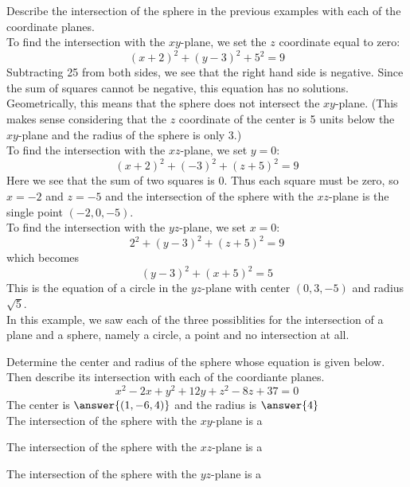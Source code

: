 \documentclass[handout]{ximera}
\begin{document}
\begin{example}
Describe the intersection of the sphere in the previous examples with each of the coordinate planes.\\
To find the intersection with the $xy$-plane, we set the $z$ coordinate equal to zero:
\[
(x+2)^2 +(y-3)^2 + 5^2 = 9
\]
Subtracting 25 from both sides, we see that the right hand side is negative.  Since the sum of squares cannot be negative, this equation has no solutions.
Geometrically, this means that the sphere does not intersect the $xy$-plane. 
(This makes sense considering that the $z$ coordinate of the center is 5 units below the $xy$-plane and the radius of the sphere is only 3.)\\
To find the intersection with the $xz$-plane, we set $y = 0$:
\[
(x+2)^2 + (-3)^2 + (z+5)^2 = 9
\]
Here we see that the sum of two squares is 0.  Thus each square must be zero, so $x = -2$ and $z = -5$ and 
the intersection of the sphere with the $xz$-plane is the single point $(-2, 0, -5)$.\\
To find the intersection with the $yz$-plane, we set $x = 0$:
\[
2^2 + (y-3)^2 + (z+5)^2 = 9
\]
which becomes
\[
(y-3)^2 + (x+5)^2 = 5
\]
This is the equation of a circle in the $yz$-plane with center $(0, 3, -5)$ and radius $\sqrt 5$.\\
In this example, we saw each of the three possiblities for the intersection of a plane and a sphere, namely a circle, a point and no intersection at all.
\end{example}


\begin{problem}
Determine the center and radius of the sphere whose equation is given below.  Then describe its intersection with each of the coordiante planes.
\[
x^2 - 2x + y^2 + 12y + z^2 - 8z +37 = 0
\]
The center is $\answer{(1, -6, 4)}$ and the radius is $\answer{4}$\\
The intersection of the sphere with the $xy$-plane is a 
\begin{multipleChoice}
\end{multipleChoice}

The intersection of the sphere with the $xz$-plane is a 
\begin{multipleChoice}
\end{multipleChoice}

The intersection of the sphere with the $yz$-plane is a 
\begin{multipleChoice}
\end{multipleChoice}

\end{problem}
\end{document}

